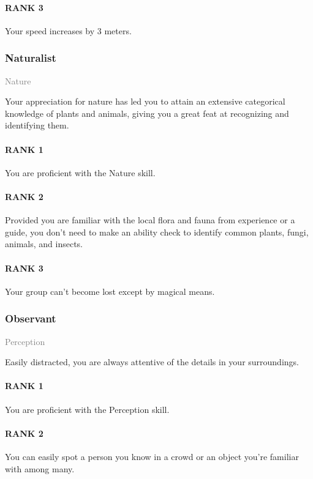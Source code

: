 \paragraph{RANK 3} Your speed increases by 3 meters.

\subsubsection{Naturalist} \label{feat::naturalist}
\small{\textcolor{gray}{Nature}}

\normalsize
Your appreciation for nature has led you to attain an extensive categorical knowledge of plants and animals, giving you a great feat at recognizing and identifying them.
\paragraph{RANK 1} You are proficient with the Nature skill.
\paragraph{RANK 2} Provided you are familiar with the local flora and fauna from experience or a guide, you don't need to make an ability check to identify common plants, fungi, animals, and insects.
\paragraph{RANK 3} Your group can't become lost except by magical means.

\subsubsection{Observant} \label{feat::observant}
\small{\textcolor{gray}{Perception}}

\normalsize
Easily distracted, you are always attentive of the details in your surroundings.
\paragraph{RANK 1} You are proficient with the Perception skill.
\paragraph{RANK 2} You can easily spot a person you know in a crowd or an object you're familiar with among many.

